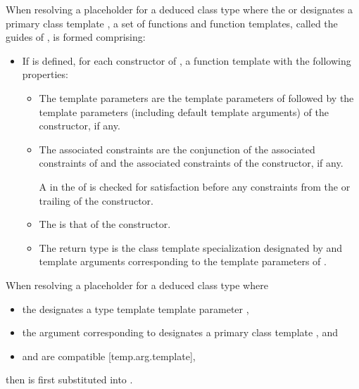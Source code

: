 \documentclass{wg21}
\begin{document}
\pnum
When resolving a placeholder for a deduced class type 
where the  or 
designates a primary class template ,
a set of functions and function templates, called the guides of ,
is formed comprising:
\begin{itemize}
\item
If  is defined,
for each constructor of ,
a function template with the following properties:
\begin{itemize}
    \item
    The template parameters are the template parameters of 
    followed
    by the template parameters (including default template arguments) of the constructor,
    if any.
    \item
    The associated constraints are the conjunction of
    the associated constraints of  and
    the associated constraints of the constructor, if any.
    \begin{note}
        A  in
        the  of 
        is checked for satisfaction before any constraints from
        the  or trailing 
        of the constructor.
    \end{note}
    \item
    The  is that of the constructor.
    \item
    The return type is the class template specialization
    designated by 
    and template arguments
    corresponding to the template parameters of .
\end{itemize}
\end{itemize}

\begin{addedblock}
When resolving a placeholder for a deduced class type 
where
\begin{itemize}
\item the  designates a type template template parameter ,
\item the argument corresponding to  designates a primary class template , and
\item {} and  are compatible [temp.arg.template],
\end{itemize}

then  is first substituted into .
\end{addedblock}
\end{document}
